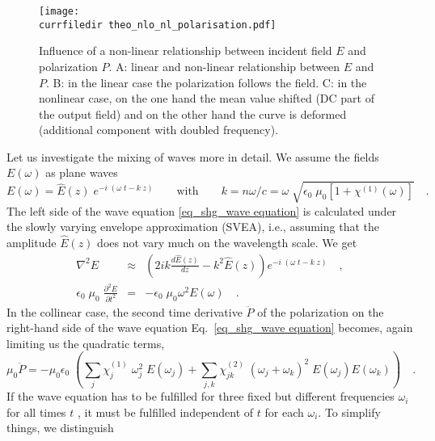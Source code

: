 \begin{figure}
\center
\texttt{[image: \\currfiledir theo\_nlo\_nl\_polarisation.pdf]}
\caption{Influence of a non-linear relationship between
incident field $E$ and polarization $P$. A: linear and non-linear relationship
between $E$ and $P$. B: in the linear case the polarization follows
the field. C: in the nonlinear case, on the one hand the mean value
shifted (DC part of the output field) and on the other hand the
curve is deformed (additional component with doubled frequency).}
\label{fig_shg_nonlinear_polarization}
\end{figure}





Let us investigate the mixing of waves more in detail.
We assume the fields $E(\omega)$ as plane waves
\begin{equation}
  E(\omega) = \hat{E}(z) \; e^{-i \; (\omega \;
  t - k \; z)} \qquad \text{with} \qquad k = n
  \omega / c = \omega \; \sqrt{\epsilon_0 \; \mu_0 [1+
  \chi^{(1)}(\omega)]} \quad.
\end{equation}
The left side of the wave equation
\ref{eq_shg_wave equation} is calculated under the slowly varying envelope approximation (SVEA), i.e., assuming that 
 the amplitude $ \hat{E}(z)$ does not vary much on the wavelength scale. We get
\begin{eqnarray}
 \nabla^2 E & \approx &  \left( 2 i k \frac{d
 \hat{E}(z)}{dz} - k^2 \hat{E}(z) \right) e^{-i \; (\omega \;
  t - k \; z)}  \quad ,\label{gl_theo_nlo_nabla2E}\\
%
 \epsilon_0 \; \mu_0 \; \frac{\partial^2 E}{\partial t^2} &=& -   \epsilon_0 \;
 \mu_0 \omega^2 E(\omega)  \quad .\label{gl_theo_nlo_partial2E_t2}
\end{eqnarray}
%
In the collinear case, the second time derivative 
$\ddot{P}$ of the polarization on the right-hand side of the wave equation Eq.~\ref{eq_shg_wave equation} becomes, again limiting us the quadratic terms, 
\begin{equation}
  \mu_0 \ddot{P} = - \mu_0 \epsilon_0 \; \left( \sum_j \chi^{(1)}_{j}\; \omega_j^2 \; E(\omega_j)
     + \sum_{j,k} \chi^{(2)}_{jk} \; (\omega_j + \omega_k)^2 \; E(\omega_j) E(\omega_k) \right) \quad .
     \label{gl_theo_nlo_ddot_p}
\end{equation}
If the wave equation  has to be fulfilled for
three fixed but different frequencies $\omega_i$ for all
times $t$ , it must be fulfilled independent of  $t$ for each
$\omega_i$. To simplify things, we distinguish 
